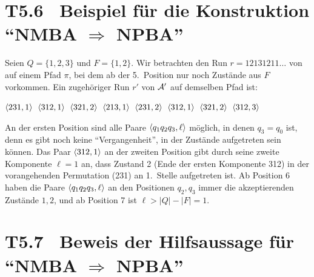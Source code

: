 \documentclass[fontsize=11pt, twoside=false, numbers=autoenddot]{scrbook}
\begin{document}
\section*{{\boldmath T5.6~ Beispiel für die Konstruktion "`NMBA $\Rightarrow$ NPBA"'}}

Seien $Q=\{1,2,3\}$ und $F=\{1,2\}$.
Wir betrachten den Run $r=12131211\dots$ von \Amc auf einem Pfad $\pi$,
bei dem ab der 5.\ Position nur noch Zustände aus $F$ vorkommen.
Ein zugehöriger Run $r'$ von $\mathcal{A}'$ auf demselben Pfad ist:
%
\begin{center}
  $\langle 231,1\rangle$\,
  $\langle 312,1\rangle$\,
  $\langle 321,2\rangle$\,
  $\langle 213,1\rangle$\,
  $\langle 231,2\rangle$\,
  $\langle 312,1\rangle$\,
  $\langle 321,2\rangle$\,
  $\langle 312,3\rangle$
\end{center}
An der ersten Position sind alle Paare $\langle q_1q_2q_3,\ell\rangle$ möglich,
in denen $q_3 = q_0$ ist, denn es gibt noch keine "`Vergangenheit"',
in der Zustände aufgetreten sein können.
Das Paar $\langle 312,1\rangle$ an der zweiten Position gibt durch seine zweite
Komponente $\ell=1$ an, dass Zustand 2 (Ende der ersten Komponente 312)
in der vorangehenden Permutation (231) an 1.\ Stelle aufgetreten ist.
Ab Position 6 haben die Paare $\langle q_1q_2q_3,\ell\rangle$
an den Positionen $q_2,q_3$ immer die akzeptierenden Zustände $1,2$,
und ab Position 7 ist $\ell > |Q|-|F| = 1$.

\goodbreak
\section*{{\boldmath T5.7~ Beweis der Hilfsaussage für "`NMBA $\Rightarrow$ NPBA"'}}
\end{document}
